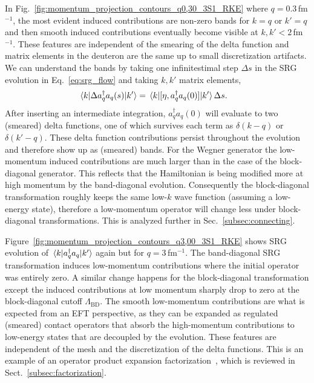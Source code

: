 \documentclass[10pt,aps,prc,floatfix,twocolumn,nofootinbib]{revtex4-1}
\newcommand{\LambdaBD}{{\Lambda_{\text{BD}}}}
\newcommand{\ataq}{a^{\dagger}_q a_q}
\begin{document}
In Fig.~\ref{fig:momentum_projection_contours_q0,30_3S1_RKE} where $q=0.3$\,fm$^{-1}$, the most evident induced contributions are non-zero bands for $k=q$ or $k'=q$ and then smooth induced contributions eventually become visible at $k,k'<2$\,fm$^{-1}$.
These features are independent of the smearing of the delta function and matrix elements in the deuteron are the same up to small discretization artifacts.
We can understand the bands by taking one infinitestimal step $\Delta s$ in the SRG evolution in Eq.~\eqref{eq:srg_flow} and taking $k,k'$ matrix elements,
%
\begin{align}
    \mel{k}{\Delta \ataq(s)}{k'} &= \mel{k}{[\eta, \ataq(0)]}{k'} \Delta s.
\end{align}
%
After inserting an intermediate integration, $\ataq(0)$ will evaluate to two (smeared) delta functions, one of which survives each term as $\delta(k-q)$ or $\delta(k'-q)$.
These delta function contributions persist throughout the evolution and therefore show up as (smeared) bands.
For the Wegner generator the low-momentum induced contributions are much larger than in the case of the block-diagonal generator. 
This reflects that the Hamiltonian is being modified more at high momentum by the band-diagonal evolution.
Consequently the block-diagonal transformation roughly keeps the same low-$k$ wave function (assuming a low-energy state), therefore a low-momentum operator will change less under block-diagonal transformations.
This is analyzed further in Sec.~\ref{subsec:connecting}.


Figure~\ref{fig:momentum_projection_contours_q3,00_3S1_RKE} shows SRG evolution of $\mel{k}{\ataq}{k'}$ again but for $q=3$\,fm$^{-1}$.
The band-diagonal SRG transformation induces low-momentum contributions where the initial operator was entirely zero.
A similar change happens for the block-diagonal transformation except the induced contributions at low momentum sharply drop to zero at the block-diagonal cutoff $\LambdaBD$.
The smooth low-momentum contributions are what is expected from an EFT perspective, as they can be expanded as regulated (smeared) contact operators that absorb the high-momentum contributions to low-energy states that are decoupled by the evolution.
These features are independent of the mesh and the discretization of the delta functions.
This is an example of an operator product expansion factorization~\cite{Anderson:2010aq,Bogner:2012zm}, which is reviewed in Sect.~\ref{subsec:factorization}.
\end{document}

